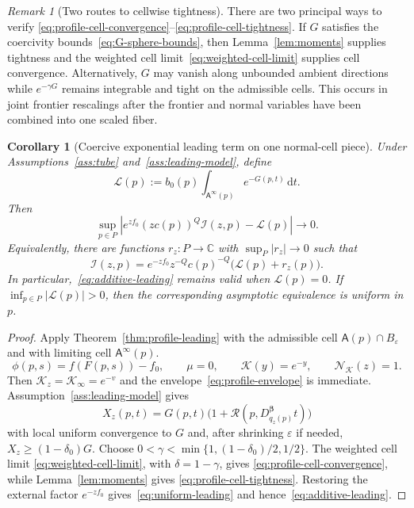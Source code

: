 \documentclass[11pt]{amsart}
\numberwithin{equation}{section}
\newtheorem{corollary}[theorem]{Corollary}
\theoremstyle{definition}
\theoremstyle{remark}
\newtheorem{remark}[theorem]{Remark}
\newcommand{\C}{\mathbb{C}}
\newcommand{\dd}{\,\mathrm{d}}
\newcommand{\eps}{\varepsilon}
\newcommand{\cI}{\mathcal{I}}
\newcommand{\Afib}{\mathsf{A}}
\newcommand{\cL}{\mathcal{L}}
\begin{document}
\begin{remark}[Two routes to cellwise tightness]
\label{rem:profile-two-routes}
There are two principal ways to verify
\eqref{eq:profile-cell-convergence}--\eqref{eq:profile-cell-tightness}.  If $G$
satisfies the coercivity bounds~\eqref{eq:G-sphere-bounds}, then
Lemma~\ref{lem:moments} supplies tightness and the weighted cell
limit~\eqref{eq:weighted-cell-limit} supplies cell convergence.  Alternatively,
$G$ may vanish along unbounded ambient directions while $e^{-\gamma G}$ remains
integrable and tight on the admissible cells.  This occurs in joint frontier
rescalings after the frontier and normal variables have been combined into one
scaled fiber.
\end{remark}

\begin{corollary}[Coercive exponential leading term on one normal-cell piece]
\label{cor:coercive-leading-piece}
Under Assumptions~\ref{ass:tube} and~\ref{ass:leading-model}, define
\begin{equation}\label{eq:leading-profile}
  \cL(p):=b_0(p)\int_{\Afib^\infty(p)}e^{-G(p,t)}\dd t.
\end{equation}
Then
\begin{equation}\label{eq:uniform-leading}
  \sup_{p\in P}\left|
  e^{zf_0}(zc(p))^Q\cI(z,p)-\cL(p)
  \right|\longrightarrow0.
\end{equation}
Equivalently, there are functions $r_z:P\to\C$ with
$\sup_P|r_z|\to0$ such that
\begin{equation}\label{eq:additive-leading}
  \cI(z,p)=e^{-zf_0}z^{-Q}c(p)^{-Q}\bigl(\cL(p)+r_z(p)\bigr).
\end{equation}
In particular,~\eqref{eq:additive-leading} remains valid when $\cL(p)=0$.  If
$\inf_{p\in P}|\cL(p)|>0$, then the corresponding asymptotic equivalence is
uniform in $p$.
\end{corollary}

\begin{proof}
Apply Theorem~\ref{thm:profile-leading} with the admissible cell
$\Afib(p)\cap B_\eps$ and with
limiting cell $\Afib^\infty(p)$.
\[
 \phi(p,s)=f(F(p,s))-f_0,
 \qquad \mu=0,
 \qquad \mathcal K(y)=e^{-y},
 \qquad \mathcal N_{\mathcal K}(z)=1.
\]
Then $\mathcal K_z=\mathcal K_\infty=e^{-v}$ and the envelope~\eqref{eq:profile-envelope} is
immediate.  Assumption~\ref{ass:leading-model} gives
\[
 X_z(p,t)=G(p,t)\bigl(1+\mathcal R(p,D_{q_z(p)}^{\bm\beta}t)\bigr)
\]
with local uniform convergence to $G$ and, after shrinking $\eps$ if needed,
$X_z\ge (1-\delta_0)G$.  Choose
$0<\gamma<\min\{1,(1-\delta_0)/2,1/2\}$.  The weighted cell limit
\eqref{eq:weighted-cell-limit}, with $\delta=1-\gamma$, gives
\eqref{eq:profile-cell-convergence}, while Lemma~\ref{lem:moments} gives
\eqref{eq:profile-cell-tightness}.  Restoring the external factor $e^{-zf_0}$
gives~\eqref{eq:uniform-leading} and hence~\eqref{eq:additive-leading}.
\end{proof}
\end{document}
